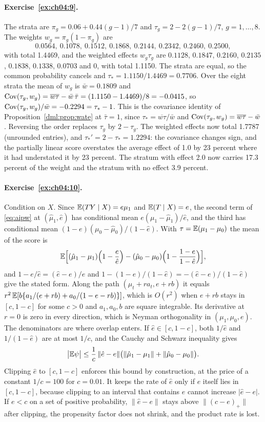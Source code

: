 \paragraph{Exercise~\ref{ex:ch04:9}.} The strata are $\pi_g = 0.06 + 0.44(g - 1)/7$ and $\tau_g = 2 - 2(g - 1)/7$, $g = 1, \dots, 8$. The weights $w_g = \pi_g(1 - \pi_g)$ are
\[
0.0564,\ 0.1078,\ 0.1512,\ 0.1868,\ 0.2144,\ 0.2342,\ 0.2460,\ 0.2500,
\]
with total 1.4469, and the weighted effects $w_g\tau_g$ are $0.1128$, $0.1847$, $0.2160$, $0.2135$, $0.1838$, $0.1338$, $0.0703$ and $0$, with total 1.1150. The strata are equal, so the common probability cancels and $\tau_* = 1.1150/1.4469 = 0.7706$. Over the eight strata the mean of $w_g$ is $\bar w = 0.1809$ and $\mathrm{Cov}(\tau_g, w_g) = \overline{w\tau} - \bar w\,\bar\tau = (1.1150 - 1.4469)/8 = -0.0415$, so $\mathrm{Cov}(\tau_g, w_g)/\bar w = -0.2294 = \tau_* - 1$. This is the covariance identity of Proposition~\ref{dml:prop:wate} at $\bar\tau = 1$, since $\tau_* = \overline{w\tau}/\bar w$ and $\mathrm{Cov}(\tau_g, w_g) = \overline{w\tau} - \bar w$. Reversing the order replaces $\tau_g$ by $2 - \tau_g$. The weighted effects now total 1.7787 (unrounded entries), and $\tau_*' = 2 - \tau_* = 1.2294$: the covariance changes sign, and the partially linear score overstates the average effect of 1.0 by 23 percent where it had understated it by 23 percent. The stratum with effect 2.0 now carries 17.3 percent of the weight and the stratum with no effect 3.9 percent.

\paragraph{Exercise~\ref{ex:ch04:10}.} Condition on $X$. Since $\mathbb{E}(TY \mid X) = e\mu_1$ and $\mathbb{E}(T \mid X) = e$, the second term of \eqref{eq:aipw} at $(\hat\mu_1, \hat e)$ has conditional mean $e(\mu_1 - \hat\mu_1)/\hat e$, and the third has conditional mean $(1 - e)(\mu_0 - \hat\mu_0)/(1 - \hat e)$. With $\tau = \mathbb{E}(\mu_1 - \mu_0)$ the mean of the score is
\[
\mathbb{E}\Bigl[(\hat\mu_1 - \mu_1)\Bigl(1 - \frac{e}{\hat e}\Bigr) - (\hat\mu_0 - \mu_0)\Bigl(1 - \frac{1 - e}{1 - \hat e}\Bigr)\Bigr],
\]
and $1 - e/\hat e = (\hat e - e)/\hat e$ and $1 - (1 - e)/(1 - \hat e) = -(\hat e - e)/(1 - \hat e)$ give the stated form. Along the path $(\mu_t + ra_t, e + rb)$ it equals $r^2\,\mathbb{E}[b\{a_1/(e + rb) + a_0/(1 - e - rb)\}]$, which is $O(r^2)$ when $e + rb$ stays in $[c, 1 - c]$ for some $c > 0$ and $a_1, a_0, b$ are square integrable. Its derivative at $r = 0$ is zero in every direction, which is Neyman orthogonality in $(\mu_1, \mu_0, e)$. The denominators are where overlap enters. If $\hat e \in [c, 1 - c]$, both $1/\hat e$ and $1/(1 - \hat e)$ are at most $1/c$, and the Cauchy and Schwarz inequality gives
\[
\bigl|\mathbb{E}\psi\bigr| \le \frac{1}{c}\,\|\hat e - e\|\bigl(\|\hat\mu_1 - \mu_1\| + \|\hat\mu_0 - \mu_0\|\bigr).
\]
Clipping $\hat e$ to $[c, 1 - c]$ enforces this bound by construction, at the price of a constant $1/c = 100$ for $c = 0.01$. It keeps the rate of $\hat e$ only if $e$ itself lies in $[c, 1 - c]$, because clipping to an interval that contains $e$ cannot increase $|\hat e - e|$. If $e < c$ on a set of positive probability, $\|\hat e - e\|$ stays above $\|(c - e)_+\|$ after clipping, the propensity factor does not shrink, and the product rate is lost.

